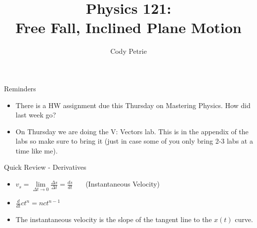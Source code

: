 \documentclass{beamer}
\title[{\color{white}{Chapters 2.5-7}}]{Physics 121: \\ Free Fall, Inclined Plane Motion}
\author{Cody Petrie}
\institute{Mesa Community College}
\date{}
\begin{document}
\begin{frame}
\titlepage
\end{frame}



\begin{frame}{Reminders}
\begin{itemize}
   \item There is a HW assignment due this Thursday on Mastering Physics. How did last week go?
   \item On Thursday we are doing the V: Vectors lab. This is in the appendix of the labs so make sure to bring it (just in case some of you only bring 2-3 labs at a time like me).
\end{itemize}
\end{frame}

\begin{frame}{Quick Review - Derivatives}
\begin{itemize}
   \item<1-> $v_s = \lim\limits_{\Delta t \rightarrow 0} \frac{\Delta s}{\Delta t} = \frac{ds}{dt}$ ~~~(Instantaneous Velocity)
   \item<2-> $\frac{d}{dt} ct^n = nct^{n-1}$
   \item<3-> The instantaneous velocity is the slope of the tangent line to the $x(t)$ curve.
\end{itemize}
\end{frame}
\end{document}
